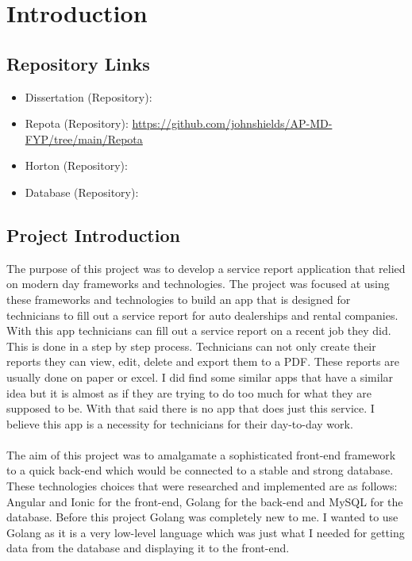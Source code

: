 \chapter{Introduction}
\section{Repository Links}
\begin{itemize}
    \item Dissertation (Repository):  
    \item Repota (Repository): \url{https://github.com/johnshields/AP-MD-FYP/tree/main/Repota}
    \item Horton (Repository):  
    \item Database (Repository):  
\end{itemize}

\section{Project Introduction}
The purpose of this project was to develop a service report application that relied on modern day frameworks and technologies. The project was focused at using these frameworks and technologies to build an app that is designed for technicians to fill out a service report for auto dealerships and rental companies. With this app technicians can fill out a service report on a recent job they did. This is done in a step by step process. Technicians can not only create their reports they can view, edit, delete and export them to a PDF. These reports are usually done on paper or excel. I did find some similar apps that have a similar idea but it is almost as if they are trying to do too much for what they are supposed to be.  With that said there is no app that does just this service. I believe this app is a necessity for technicians for their day-to-day work.
\\\\ The aim of this project was to amalgamate a  sophisticated front-end framework to a quick back-end which would be connected to a stable and strong database. These technologies choices that were researched and implemented are as follows: Angular and Ionic for the front-end, Golang for the back-end and MySQL for the database. Before this project Golang was completely new to me. I wanted to use Golang as it is a very low-level language which was just what I needed for getting data from the database and displaying it to the front-end.
\\\\

